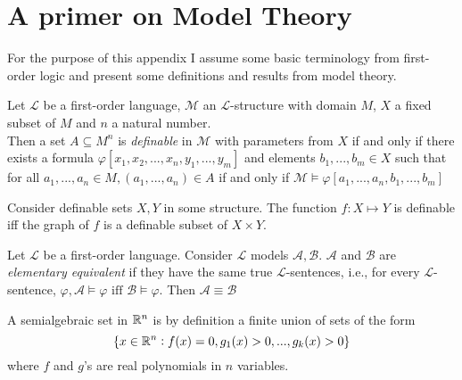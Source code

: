 \chapter{A primer on Model Theory}
\label{chap:model-theory}
For the purpose of this appendix I assume some basic terminology from first-order logic and present some definitions and results from model theory.

\begin{definition}
    \label{def:definable-set}
    Let $\mathcal{L}$ be a first-order language, $\mathcal{M}$ an $\mathcal{L}$-structure with domain $M$, $X$ a fixed subset of $M$ and $n$ a natural number. \\
    Then a set $A\subseteq M^n$ is \textit{definable} in $\mathcal{M}$ with parameters from $X$ if and only if there exists a formula $\varphi[x_1,x_2,...,x_n,y_1,...,y_m]$ and elements $b_1,...,b_m\in X$ such that for all $a_1,...,a_n\in M, (a_1,...,a_n)\in A$ if and only if $\mathcal{M}\models\varphi[a_1,...,a_n,b_1,...,b_m]$
\end{definition}

\begin{definition}
    \label{def:definable-function}
    Consider definable sets $X, Y$ in some structure. The function $f:X\mapsto Y$ is definable iff the graph of $f$ is a definable subset of $X\times Y$.
\end{definition}

\begin{definition}
    \label{def:elementary-equivalence}
    Let $\mathcal{L}$ be a first-order language. Consider $\mathcal{L}$ models $\mathcal{A}, \mathcal{B}$. $\mathcal{A}$ and $\mathcal{B}$ are \textit{elementary equivalent} if they have the same true $\mathcal{L}$-sentences, i.e., for every $\mathcal{L}$-sentence, $\varphi, \mathcal{A}\models\varphi \text{ iff }\mathcal{B}\models\varphi$. Then $\mathcal{A}\equiv\mathcal{B}$ 
\end{definition}

\begin{definition}
    \label{def:semialgebraic-set}
    A semialgebraic set in $\mathbb{R}^n$ is by definition a finite union of sets of the form
    \begin{equation*}
        \{x\in\mathbb{R}^n : f(x) = 0, g_1(x)>0,...,g_k(x)>0\}
    \end{equation*}
    where $f$ and $g$'s are real polynomials in $n$ variables.
\end{definition}

